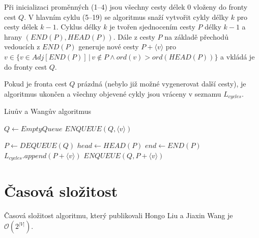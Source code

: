         Při inicializaci proměnných (1--4) jsou všechny cesty délek 0 vloženy do fronty cest $Q$. V hlavním cyklu (5--19) se algoritmus snaží vytvořit cykly délky $k$ pro cesty délek $k-1$. Cyklus délky $k$ je tvořen sjednocením cesty $P$ délky $k-1$ a hrany $(END(P), HEAD(P))$. Dále z cesty $P$ na základě přechodů vedoucích z $END(P)$ generuje nové cesty $P + \langle v \rangle$ pro $v \in \{v \in Adj[END(P)] \,|\, v \notin P \land ord(v) > ord(HEAD(P))\}$ a vkládá je do fronty cest $Q$.

        Pokud je fronta cest $Q$ prázdná (nebylo již možné vygenerovat další cesty), je algoritmus ukončen a všechny objevené cykly jsou vráceny v seznamu $L_{cycles}$.

        \newpage

        \begin{algorithm}
            \DontPrintSemicolon
            \caption{Liuův a Wangův algoritmus}
            \vspace*{0.5em}

            \;
            $Q \leftarrow EmptyQueue$\;
            {
                $ENQUEUE(Q, \langle v \rangle)$\;
            }
            \vspace*{0.5em}

            {
                $P \leftarrow \mathit{DEQUEUE}(Q)$\;
                $head \leftarrow \mathit{HEAD}(P)$\;
                $end \leftarrow \mathit{END}(P)$\;
                {
                    {
                        $L_{cycles}.append(P + \langle v \rangle)$\;
                    }
                    {
                        {
                            $\mathit{ENQUEUE}(Q, P + \langle v \rangle)$\;
                        }
                    }
                }
            }
            \vspace*{0.5em}


        \end{algorithm}

    \section{Časová složitost}
        \begin{theorem}
            Časová složitost algoritmu, který publikovali Hongo Liu a Jiaxin Wang je $\mathcal{O}(2^{|V|})$.
        \end{theorem}

